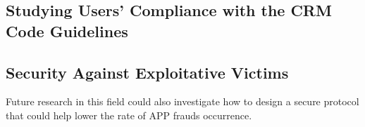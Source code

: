 \subsection{Studying Users' Compliance with the CRM Code Guidelines}


\subsection{Security Against Exploitative Victims}


Future research in this field could also investigate how to design a secure protocol that could help lower the rate of APP frauds occurrence.


